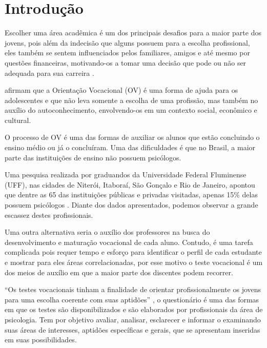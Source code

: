 \documentclass[
	12pt,				%
    oneside,			%
	a4paper,			%
	english,			%
	french,				%
	spanish,			%
	brazil,				%
	]{abntex2}
\begin{document}
\chapter{Introdução} %

Escolher uma área acadêmica é um dos principais desafios para a maior parte dos jovens, pois além da indecisão que alguns possuem para a escolha profissional, eles também se sentem influenciados pelos familiares, amigos e até mesmo por questões financeiras, motivando-os a tomar uma decisão que pode ou não ser adequada para sua carreira \cite{goncalves}.

 afirmam que a Orientação Vocacional (OV) é uma forma de ajuda para os adolescentes e que não leva somente a escolha de uma profissão, mas também no auxílio do autoconhecimento, envolvendo-os em um contexto social, econômico e cultural.

O processo de OV é uma das formas de auxiliar os alunos que estão concluindo o ensino médio ou já o concluíram. Uma das dificuldades é que no Brasil, a maior parte das instituições de ensino não possuem psicólogos.

Uma pesquisa realizada por graduandos da Universidade Federal Fluminense (UFF), nas cidades de Niterói, Itaboraí, São Gonçalo e Rio de Janeiro, apontou que dentre as 65 das instituições públicas e privadas visitadas, apenas 15\% delas possuem psicólogos \cite{arreguy}. Diante dos dados apresentados, podemos observar a grande escassez destes profissionais.

Uma outra alternativa seria o auxílio dos professores na busca do desenvolvimento e maturação vocacional de cada aluno. Contudo, é uma tarefa complicada pois requer tempo e esforço para identificar o perfil de cada estudante e mostrar para eles áreas correlacionadas, por esse motivo o teste vocacional é um dos meios de auxílio em que a maior parte dos discentes podem recorrer.

\enquote{Os testes vocacionais tinham a finalidade de orientar profissionalmente os jovens para uma escolha coerente com suas aptidões} \cite{abade}, o questionário é uma das formas em que os testes são disponibilizados e são elaborados por profissionais da área de psicologia. Tem por objetivo avaliar, analisar, esclarecer e informar o examinando suas áreas de interesses, aptidões específicas e gerais, que se apresentam inseridas em suas possibilidades.
\end{document}
